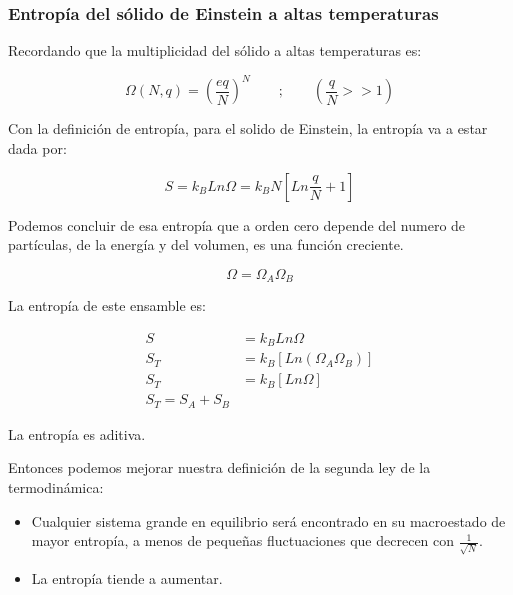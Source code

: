 \documentclass[11pt,fleqn]{book}
\begin{document}
\subsubsection{Entropía del sólido de Einstein a altas temperaturas}

Recordando que la multiplicidad del sólido a altas temperaturas es:

\begin{equation}
    \Omega(N,q)=\left(\frac{eq}{N}\right)^{N}\qquad;\qquad\left(\frac{q}{N}>>1\right)
    \label{Eq. 3.14}
\end{equation}

Con la definición de entropía, para el solido de Einstein, la entropía va a estar dada por: 

\begin{equation}
    S=k_{B}Ln\Omega=k_{B}N\left[Ln\frac{q}{N}+1\right]
    \label{Eq. 3.15}
\end{equation}

Podemos concluir de esa entropía que a orden cero depende del numero de partículas, de la energía y del volumen, es una función creciente.


\begin{equation*}
    \Omega=\Omega_{A}\Omega_{B}
\end{equation*}

La entropía de este ensamble es:

\begin{equation}
    \begin{split}
        S&=k_{B}Ln\Omega\\
        S_{T}&=k_{B}[Ln(\Omega_{A}\Omega_{B})]\\
        S_{T}&=k_{B}[Ln\Omega]\\
        S_{T}=S_{A}+S_{B}
    \end{split}
    \label{Eq. 3.16}
\end{equation}

La entropía es aditiva. 

Entonces podemos mejorar nuestra definición de la segunda ley de la termodinámica:

\begin{itemize}
    \item Cualquier sistema grande en equilibrio será encontrado en su macroestado de mayor entropía, a menos de pequeñas fluctuaciones que decrecen con $\frac{1}{\sqrt{N}}$.
    \item La entropía tiende a aumentar.
\end{itemize}
\end{document}
